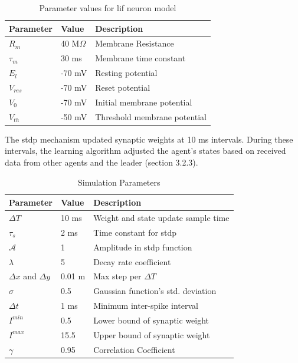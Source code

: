 \begin{table}[H]
\caption{Parameter values for \ac{lif} neuron model \cite{Ch_1_R10}}
\label{table:ParameterforLIF}
\centering
\begin{tabular}{l l l}
\hline
\textbf{Parameter} & \textbf{Value} & \textbf{Description} \\
\hline
$R_{m}$ & 40 M$\Omega$ & Membrane Resistance \\
$\tau_{m}$ & 30 ms & Membrane time constant \\
$E_{l}$ & -70 mV & Resting potential \\
$V_{res}$ & -70 mV & Reset potential \\
$V_{0}$ & -70 mV & Initial membrane potential \\
$V_{th}$ & -50 mV & Threshold membrane potential \\
\hline
\end{tabular}
\end{table}

The \ac{stdp} mechanism updated synaptic weights at 10 ms intervals. During these intervals, the learning algorithm adjusted the agent's states based on received data from other agents and the leader (section 3.2.3).

\begin{table}[H]
\caption{Simulation Parameters}
\label{table:simulation-parameters}
\centering
\begingroup
\renewcommand{\arraystretch}{1.5}
\begin{tabular}{l l l}
\hline
\textbf{Parameter} & \textbf{Value} & \textbf{Description} \\ 
\hline
\(\Delta T\) & 10 ms & Weight and state update sample time \\
\(\tau_{s}\) & 2 ms & Time constant for \ac{stdp} \\
\(\mathcal{A}\) & 1 & Amplitude in \ac{stdp} function \\
\(\lambda\) & 5 & Decay rate coefficient\\
\(\Delta x\) and \(\Delta y\) & 0.01 m & Max step per \(\Delta T\) \\
\(\sigma\) & 0.5 & Gaussian function's std. deviation \\
\(\Delta t\) & 1 ms & Minimum inter-spike interval \\
\(I^{min}\) & 0.5 & Lower bound of synaptic weight \\
\(I^{max}\) & 15.5 & Upper bound of synaptic weight \\
\(\gamma\) & 0.95 & Correlation Coefficient\\
\hline
\end{tabular}
\endgroup
\end{table}

